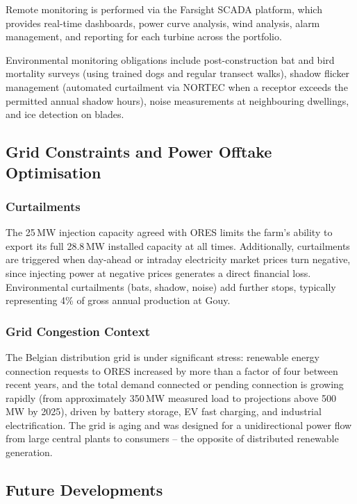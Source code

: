 Remote monitoring is performed via the Farsight SCADA platform, which provides real-time
dashboards, power curve analysis, wind analysis, alarm management, and reporting for each
turbine across the portfolio.

Environmental monitoring obligations include post-construction bat and bird mortality surveys
(using trained dogs and regular transect walks), shadow flicker management (automated
curtailment via NORTEC when a receptor exceeds the permitted annual shadow hours), noise
measurements at neighbouring dwellings, and ice detection on blades.

\subsection{Grid Constraints and Power Offtake Optimisation}

\subsubsection{Curtailments}

The 25\,MW injection capacity agreed with ORES limits the farm's ability to export its full
28.8\,MW installed capacity at all times. Additionally, curtailments are triggered when day-ahead
or intraday electricity market prices turn negative, since injecting power at negative prices
generates a direct financial loss. Environmental curtailments (bats, shadow, noise) add further
stops, typically representing 4\% of gross annual production at Gouy.

\subsubsection{Grid Congestion Context}

The Belgian distribution grid is under significant stress: renewable energy connection requests
to ORES increased by more than a factor of four between recent years, and the total demand
connected or pending connection is growing rapidly (from approximately 350\,MW measured load
to projections above 500\,MW by 2025), driven by battery storage, EV fast charging, and
industrial electrification. The grid is aging and was designed for a unidirectional power flow
from large central plants to consumers -- the opposite of distributed renewable generation.

\subsection{Future Developments}

